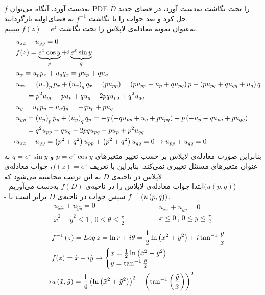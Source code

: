 $f$
به‌دست آورد، آنگاه می‌توان
PDE
را تحت نگاشت به‌دست آورد، در فضای جدید
$\tilde{D}$
حل کرد و بعد جواب را با نگاشت
$f^{-1}$
به فضای‌اولیه بازگردانید.\\
به‌عنوان نمونه معادله‌ی لاپلاس را تحت نگاشت
$f(z)=e^z$
ببینیم.
\[\begin{aligned}
	&
	u_{xx}+u_{yy}=0
	\\ &
	f(z)=\underbrace{e^x\cos y}_{p}+i \underbrace{e^x\sin y}_{q}
	\\ &
	u_x=u_pp_x+u_qq_x=pu_p+qu_q
	\\ &
	\begin{aligned}
		u_{xx} &= \left(u_x\right)_pp_x+\left(u_x\right)_qq_x=\left(pu_{pp}\right)=\left(pu_{pp}+u_p+qu_{pq}\right)p+\left(pu_{pq}+qu_{qq}+u_{q}\right)q
		\\ &
		=p^2u_{pp}+pu_p+qu_q+2pqu_{pq}+q^2u_{qq}
	\end{aligned}
	\\ &
	u_y=u_pp_y+u_qq_y=-qu_p+pu_q
	\\ &\begin{aligned}
		u_{yy}&=\left(u_y\right)_pp_y+\left(u_y\right)_qq_y=-q\left(-qu_{pp}+u_q+pu_{pq}\right)+p\left(-u_p-qu_{pq}+pu_{qq}\right)
		\\ &=q^2u_{pp}-qu_q-2pqu_{pq}-pu_p+p^2u_{qq}
	\end{aligned}
\\ \longrightarrow &
u_{xx}+u_{yy}=\left(p^2+q^2\right)u_{pp}+\left(p^2+q^2\right)u_{qq}=0\rightarrow u_{pp}+u_{qq}=0
\end{aligned}\]
بنابراین صورت معادله‌ی لاپلاس بر حسب تغییر متغیر‌های
$p=e^x\cos y$
و
$q=e^x\sin y$
به عنوان متغیر‌های مستثل تغییری نمی‌کند. بنابراین با تعریف
$f(z)=e^z$،
جواب معادله‌ی لاپلاس در ناحیه‌ی
$D$
به این ترتیب محاسبه می‌شود که\\
- ابتدا جواب معادله‌ی لاپلاس را در ناحیه‌ی
$f(D)$
به‌دست می‌آوریم($u(p,q)$)\\
- سپس جواب در ناحیه‌ی
$D$
برابر است با
$f^{-1}\left(u\left(p,q\right)\right)$.
\[
\begin{matrix}
	u_{\tilde x\tilde x}+u_{\tilde y\tilde y}=0\\
	{\tilde x}^2+{\tilde y}^2\le1 \, , \, 0\le \theta \le \frac\pi2
\end{matrix}\qquad\qquad\begin{matrix}
u_{xx}+u_{yy}=0\\
x\le0 \, , \, 0\le y\le \frac\pi2
\end{matrix}
\]
\[\begin{aligned}
&f^{-1}\left(z\right)=Log\, z=\ln r+i\theta=\frac12\ln\left(x^2+y^2\right)+i\tan^{-1}\frac yx
\\ &
f(z)=\tilde x+i\tilde y\rightarrow\begin{cases}
	x=\frac12\ln\left({\tilde x}^2+{\tilde y}^2\right)\\
	y=\tan^{-1}\frac{\tilde y}{\tilde x}
\end{cases}
\\ \longrightarrow &
u\left(\tilde x,\tilde y\right)=\frac14\left(\ln\left({\tilde x}^2+{\tilde y}^2\right)\right)^2-\left(\tan^{-1}\left(\frac{\tilde y}{\tilde x}\right)\right)^2
\end{aligned}\]
